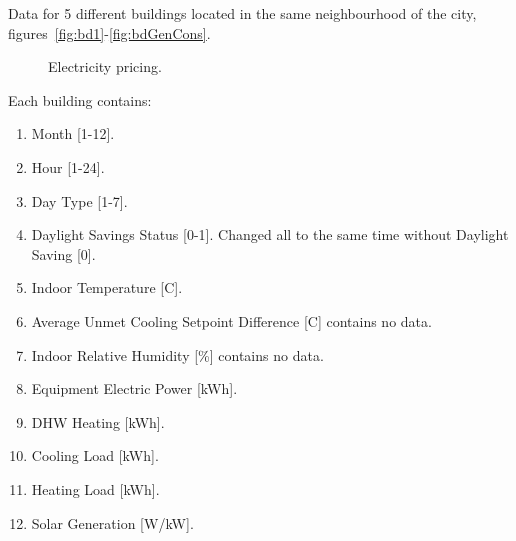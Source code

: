 \documentclass{article}
\numberwithin{equation}{subsection}
\begin{document}
\begin{itemize}
		
	Data for 5 different buildings located in the same neighbourhood of the city, figures~\ref{fig:bd1}-\ref{fig:bdGenCons}. 
		\begin{figure}[H]
		\centering	
			 \quad
			\caption{\small Electricity pricing.}
		\end{figure}
		Each building contains:
		\begin{enumerate}
			\item Month	[1-12].
			\item Hour	[1-24].
			\item Day Type	[1-7].
			\item Daylight Savings Status  [0-1]. Changed all to the same time without Daylight Saving [0]. 
			\item Indoor Temperature [C].
			\item Average Unmet Cooling Setpoint Difference [C]	contains no data.
			\item Indoor Relative Humidity [\%]	contains no data.
			\item Equipment Electric Power [kWh].
			\item DHW Heating [kWh].
			\item Cooling Load [kWh].
			\item Heating Load [kWh].
			\item Solar Generation [W/kW].
		\end{enumerate}
		
\end{itemize}
\end{document}
